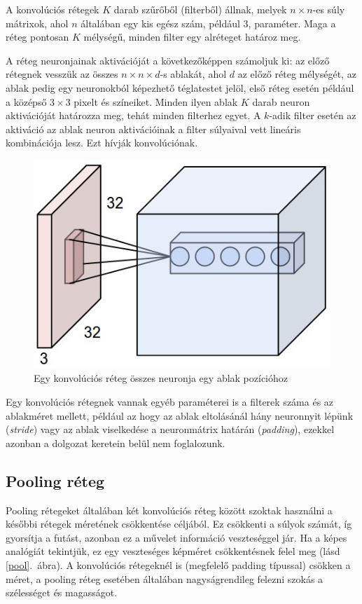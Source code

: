 A konvolúciós rétegek $K$ darab szűrőből (filterből) állnak, melyek $n\times n$-es súly mátrixok, ahol $n$ általában egy kis egész szám, például 3, paraméter. Maga a réteg pontosan $K$ mélységű, minden filter egy alréteget határoz meg.

A réteg neuronjainak aktivációját a következőképpen számoljuk ki: az előző rétegnek vesszük az összes $n\times n\times d$-s ablakát, ahol $d$ az előző réteg mélységét, az ablak pedig egy neuronokból képezhető téglatestet jelöl, első réteg esetén például a középső $3\times3$ pixelt és színeiket. Minden ilyen ablak $K$ darab neuron aktivációját határozza meg, tehát minden filterhez egyet. A $k$-adik filter esetén az aktiváció az ablak neuron aktivációinak a filter súlyaival vett lineáris kombinációja lesz. Ezt hívják konvolúciónak.

\begin{figure}[h!]
\begin{center}
  \includegraphics[width=0.4\linewidth]{depthcol.jpg}
  \caption{Egy konvolúciós réteg összes neuronja egy ablak pozícióhoz}
\end{center}
\end{figure}

Egy konvolúciós rétegnek vannak egyéb paraméterei is a filterek száma és az ablakméret mellett, például az hogy az ablak eltolásánál hány neuronnyit lépünk (\emph{stride}) vagy az ablak viselkedése a neuronmátrix határán (\emph{padding}), ezekkel azonban a dolgozat keretein belül nem foglalozunk.

\subsection{Pooling réteg}

Pooling rétegeket általában két konvolúciós réteg között szoktak használni a későbbi rétegek méretének csökkentése céljából. Ez csökkenti a súlyok számát, íg gyorsítja a futást, azonban ez a művelet információ veszteséggel jár. Ha a képes analógiát tekintjük, ez egy veszteséges képméret csökkentésnek felel meg (lásd \ref{pool}.~ábra). A konvolúciós rétegeknél is (megfelelő padding típussal) csökken a méret, a pooling réteg esetében általában nagyságrendileg felezni szokás a szélességet és magasságot.

